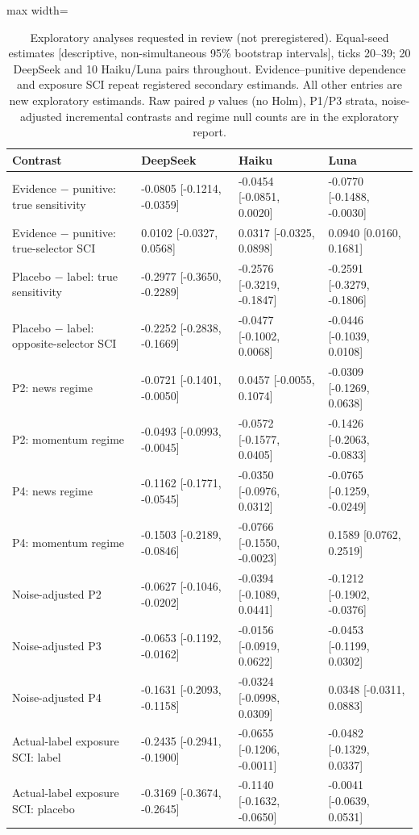 \begin{table}[tbp]
\caption{Exploratory analyses requested in review (not preregistered). Equal-seed estimates [descriptive, non-simultaneous 95\% bootstrap intervals], ticks 20--39; 20 DeepSeek and 10 Haiku/Luna pairs throughout. Evidence--punitive dependence and exposure SCI repeat registered secondary estimands. All other entries are new exploratory estimands. Raw paired $p$ values (no Holm), P1/P3 strata, noise-adjusted incremental contrasts and regime null counts are in the exploratory report.}
\label{tab:exploratory}
\centering\footnotesize
\setlength{\tabcolsep}{3pt}
\begin{adjustbox}{max width=\linewidth}
\begin{tabular}{llll}
\toprule
Contrast & DeepSeek & Haiku & Luna \\
\midrule
Evidence $-$ punitive: true sensitivity & -0.0805 [-0.1214, -0.0359] & -0.0454 [-0.0851, 0.0020] & -0.0770 [-0.1488, -0.0030] \\
Evidence $-$ punitive: true-selector SCI & 0.0102 [-0.0327, 0.0568] & 0.0317 [-0.0325, 0.0898] & 0.0940 [0.0160, 0.1681] \\
Placebo $-$ label: true sensitivity & -0.2977 [-0.3650, -0.2289] & -0.2576 [-0.3219, -0.1847] & -0.2591 [-0.3279, -0.1806] \\
Placebo $-$ label: opposite-selector SCI & -0.2252 [-0.2838, -0.1669] & -0.0477 [-0.1002, 0.0068] & -0.0446 [-0.1039, 0.0108] \\
P2: news regime & -0.0721 [-0.1401, -0.0050] & 0.0457 [-0.0055, 0.1074] & -0.0309 [-0.1269, 0.0638] \\
P2: momentum regime & -0.0493 [-0.0993, -0.0045] & -0.0572 [-0.1577, 0.0405] & -0.1426 [-0.2063, -0.0833] \\
P4: news regime & -0.1162 [-0.1771, -0.0545] & -0.0350 [-0.0976, 0.0312] & -0.0765 [-0.1259, -0.0249] \\
P4: momentum regime & -0.1503 [-0.2189, -0.0846] & -0.0766 [-0.1550, -0.0023] & 0.1589 [0.0762, 0.2519] \\
Noise-adjusted P2 & -0.0627 [-0.1046, -0.0202] & -0.0394 [-0.1089, 0.0441] & -0.1212 [-0.1902, -0.0376] \\
Noise-adjusted P3 & -0.0653 [-0.1192, -0.0162] & -0.0156 [-0.0919, 0.0622] & -0.0453 [-0.1199, 0.0302] \\
Noise-adjusted P4 & -0.1631 [-0.2093, -0.1158] & -0.0324 [-0.0998, 0.0309] & 0.0348 [-0.0311, 0.0883] \\
Actual-label exposure SCI: label & -0.2435 [-0.2941, -0.1900] & -0.0655 [-0.1206, -0.0011] & -0.0482 [-0.1329, 0.0337] \\
Actual-label exposure SCI: placebo & -0.3169 [-0.3674, -0.2645] & -0.1140 [-0.1632, -0.0650] & -0.0041 [-0.0639, 0.0531] \\
\bottomrule
\end{tabular}
\end{adjustbox}
\end{table}
